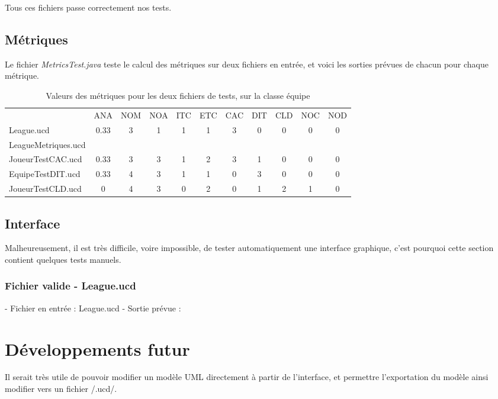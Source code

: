 \documentclass[letter,french]{report}
\begin{document}
  Tous ces fichiers passe correctement nos tests.

  \subsection{Métriques}
  Le fichier \emph{MetricsTest.java} teste le calcul des métriques sur deux
  fichiers en entrée, et voici les sorties prévues de chacun pour chaque métrique.
  
  
  \begin{table}[]
    \centering
    \caption{Valeurs des métriques pour les deux fichiers de tests, sur la
      classe équipe}
    \begin{tabular}{lcccccccccc}
                          & ANA  & NOM & NOA & ITC & ETC & CAC & DIT & CLD & NOC & NOD \\
      League.ucd          & 0.33 & 3   & 1   & 1   & 1   & 3   & 0   & 0   & 0   & 0   \\
      LeagueMetriques.ucd &      &     &     &     &     &     &     &     &     &     \\
      JoueurTestCAC.ucd   & 0.33 & 3   & 3   & 1   & 2   & 3   & 1   & 0   & 0   & 0   \\
      EquipeTestDIT.ucd  & 0.33 & 4   & 3   & 1   & 1   & 0   & 3   & 0   & 0   & 0   \\
      JoueurTestCLD.ucd  & 0    & 4   & 3   & 0   & 2   & 0   & 1   & 2   & 1   & 0   \\
      
    \end{tabular}
  \end{table}

  \subsection{Interface}
  Malheureusement, il est très difficile, voire impossible, de tester
  automatiquement une interface graphique, c'est pourquoi cette section
  contient quelques tests manuels.

  \subsubsection{Fichier valide - League.ucd}
  - Fichier en entrée : League.ucd
  - Sortie prévue : 


  

	\section*{Développements futur}
	Il serait très utile de pouvoir modifier un modèle UML directement à partir de l'interface,
	et permettre l'exportation du modèle ainsi modifier vers un fichier /.ucd/.
	
\end{document}
